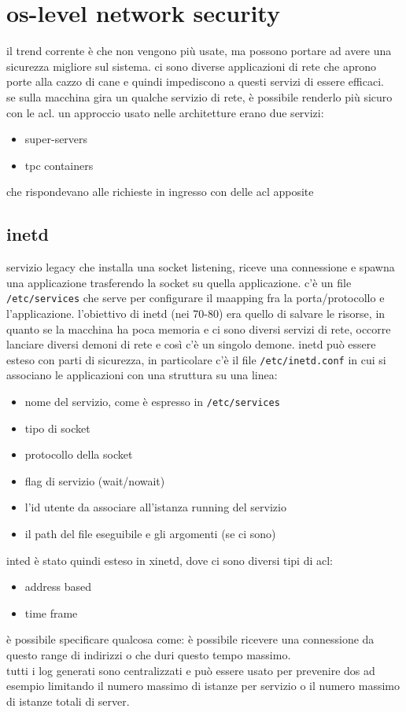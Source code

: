\documentclass[12pt, oneside]{extbook} %
\begin{document}
\section{os-level network security}
il trend corrente è che non vengono più usate, ma possono portare ad avere una sicurezza migliore sul sistema. ci sono diverse applicazioni di rete che aprono porte alla cazzo di cane e quindi impediscono a questi servizi di essere efficaci.\\se sulla macchina gira un qualche servizio di rete, è possibile renderlo più sicuro con le acl. un approccio usato nelle architetture erano due servizi:
\begin{itemize}
\item super-servers
\item tpc containers
\end{itemize}
che rispondevano alle richieste in ingresso con delle acl apposite
\subsection{inetd}
servizio legacy che installa una socket listening, riceve una connessione e spawna una applicazione trasferendo la socket su quella applicazione. c'è un file \texttt{/etc/services} che serve per configurare il maapping fra la porta/protocollo e l'applicazione. l'obiettivo di inetd (nei 70-80) era quello di salvare le risorse, in quanto se la macchina ha poca memoria e ci sono diversi servizi di rete, occorre lanciare diversi demoni di rete e così c'è un singolo demone. inetd può essere esteso con parti di sicurezza, in particolare c'è il file \texttt{/etc/inetd.conf} in cui si associano le applicazioni con una struttura su una linea:
\begin{itemize}
	\item nome del servizio, come è espresso in \texttt{/etc/services}
	\item tipo di socket
	\item protocollo della socket
	\item flag di servizio (wait/nowait)
	\item l'id utente da associare all'istanza running del servizio
	\item il path del file eseguibile e gli argomenti (se ci sono)
\end{itemize}
inted è stato quindi esteso in xinetd, dove ci sono diversi tipi di acl:
\begin{itemize}
\item address based
\item time frame
\end{itemize}
è possibile specificare qualcosa come: è possibile ricevere una connessione da questo range di indirizzi o che duri questo tempo massimo.\\tutti i log generati sono centralizzati e può essere usato per prevenire dos ad esempio limitando il numero massimo di istanze per servizio o il numero massimo di istanze totali di server.
\end{document}
